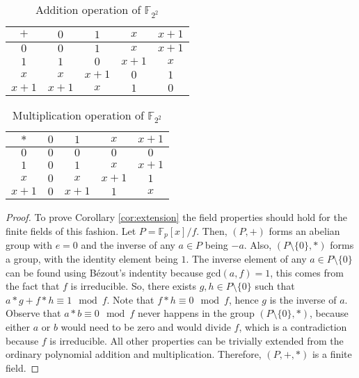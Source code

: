 \documentclass{ufsctex/ufsctex}
\begin{document}
\begin{table}
\begin{center}
\begin{tabular}{c|cccc}
$+$   & $0$   & $1$   & $x$   & $x+1$ \\
\hline
$0$   & $0$   & $1$   & $x$   & $x+1$ \\
$1$   & $1$   & $0$   & $x+1$ & $x$   \\
$x$   & $x$   & $x+1$ & $0$   & $1$   \\
$x+1$ & $x+1$ & $x$   & $1$   & $0$   \\
\end{tabular}
\caption{Addition operation of $\mathbb{F}_{2^2}$}
\label{tab:addition}
\end{center}
\end{table}

\begin{table}
\begin{center}
\begin{tabular}{c|cccc}
$*$   & $0$ & $1$   & $x$   & $x+1$ \\
\hline
$0$   & $0$ & $0$   & $0$   & $0$   \\
$1$   & $0$ & $1$   & $x$   & $x+1$ \\
$x$   & $0$ & $x$   & $x+1$ & $1$   \\
$x+1$ & $0$ & $x+1$ & $1$   & $x$   \\
\end{tabular}
\caption{Multiplication operation of $\mathbb{F}_{2^2}$}
\label{tab:multiplication}
\end{center}
\end{table}

\begin{proof}
To prove Corollary \ref{cor:extension} the field properties should hold for the
finite fields of this fashion. Let $P = \mathbb{F}_p[x]/f$. Then, $(P, +)$
forms an abelian group with $e = 0$ and the inverse of any $a \in P$ being
$-a$. Also, $(P \setminus \{0\}, *)$ forms a group, with the identity element
being $1$. The inverse element of any $a \in P \setminus \{0\}$ can be found
using Bézout's indentity because $\text{gcd}(a, f) = 1$, this comes from the
fact that $f$ is irreducible. So, there exists $g, h \in P \setminus \{0\}$
such that $a*g + f*h \equiv 1 \mod f$. Note that $f*h \equiv 0 \mod f$, hence
$g$ is the inverse of $a$.  Observe that $a*b \equiv 0 \mod f$ never happens in
the group $(P \setminus \{0\}, *)$, because either $a$ or $b$ would need to be
zero and would divide $f$, which is a contradiction because $f$ is irreducible.
All other properties can be trivially extended from the ordinary polynomial
addition and multiplication. Therefore, $(P, +, *)$ is a finite field.
\end{proof}
\end{document}
